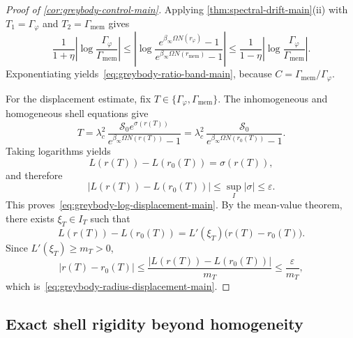 \begin{proof}[Proof of \cref{cor:greybody-control-main}]
Applying \cref{thm:spectral-drift-main}(ii) with $T_1=\Gamma_\varphi$ and $T_2=\Gamma_{\mathrm{mem}}$ gives
\[
\frac{1}{1+\eta}\left|\log\frac{\Gamma_\varphi}{\Gamma_{\mathrm{mem}}}\right|
\le
\left|
\log
\frac{e^{\beta_\infty\Omega N(r_\varphi)}-1}
     {e^{\beta_\infty\Omega N(r_{\mathrm{mem}})}-1}
\right|
\le
\frac{1}{1-\eta}\left|\log\frac{\Gamma_\varphi}{\Gamma_{\mathrm{mem}}}\right|.
\]
Exponentiating yields~\eqref{eq:greybody-ratio-band-main}, because $C=\Gamma_{\mathrm{mem}}/\Gamma_\varphi$.

For the displacement estimate, fix $T\in\{\Gamma_\varphi,\Gamma_{\mathrm{mem}}\}$. The inhomogeneous and homogeneous shell equations give
\[
T=\lambda_c^2\,
\frac{\mathcal S_0e^{\sigma(r(T))}}{e^{\beta_\infty\Omega N(r(T))}-1}
=
\lambda_c^2\,
\frac{\mathcal S_0}{e^{\beta_\infty\Omega N(r_0(T))}-1}.
\]
Taking logarithms yields
\[
L(r(T))-L(r_0(T))=\sigma(r(T)),
\]
and therefore
\[
\left|L(r(T))-L(r_0(T))\right|
\le
\sup_I|\sigma|
\le
\varepsilon.
\]
This proves~\eqref{eq:greybody-log-displacement-main}. By the mean-value theorem, there exists $\xi_T\in I_T$ such that
\[
L(r(T))-L(r_0(T))=L'(\xi_T)\bigl(r(T)-r_0(T)\bigr).
\]
Since $L'(\xi_T)\ge m_T>0$,
\[
\left|r(T)-r_0(T)\right|
\le
\frac{\left|L(r(T))-L(r_0(T))\right|}{m_T}
\le
\frac{\varepsilon}{m_T},
\]
which is~\eqref{eq:greybody-radius-displacement-main}.
\end{proof}

\subsection{Exact shell rigidity beyond homogeneity}

